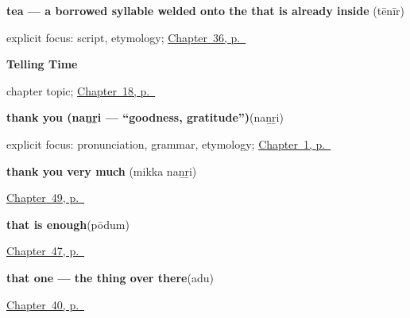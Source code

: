 \noindent\begin{minipage}[t]{\linewidth}
\raggedright
\textbf{tea — a borrowed syllable welded onto the  that is already inside }\enspace\emph{}\enspace(tēnīr)\par
\footnotesize explicit focus: script, etymology; \hyperref[ch:ta-what-you-are-offered]{Chapter~36, p.~\pageref*{ch:ta-what-you-are-offered}}
\end{minipage}\par\smallskip

\noindent\begin{minipage}[t]{\linewidth}
\raggedright
\textbf{Telling Time}\par
\footnotesize chapter topic; \hyperref[ch:ta-telling-time]{Chapter~18, p.~\pageref*{ch:ta-telling-time}}
\end{minipage}\par\smallskip

\noindent\begin{minipage}[t]{\linewidth}
\raggedright
\textbf{thank you (naṉṟi — \textquotedblleft{}goodness, gratitude\textquotedblright{})}\enspace\emph{}\enspace(naṉṟi)\par
\footnotesize explicit focus: pronunciation, grammar, etymology; \hyperref[ch:greetings]{Chapter~1, p.~\pageref*{ch:greetings}}
\end{minipage}\par\smallskip

\noindent\begin{minipage}[t]{\linewidth}
\raggedright
\textbf{thank you very much}\enspace\emph{ }\enspace(mikka naṉṟi)\par
\footnotesize \hyperref[ch:ta-courtesy]{Chapter~49, p.~\pageref*{ch:ta-courtesy}}
\end{minipage}\par\smallskip

\noindent\begin{minipage}[t]{\linewidth}
\raggedright
\textbf{that is enough}\enspace\emph{}\enspace(pōdum)\par
\footnotesize \hyperref[ch:ta-replies]{Chapter~47, p.~\pageref*{ch:ta-replies}}
\end{minipage}\par\smallskip

\noindent\begin{minipage}[t]{\linewidth}
\raggedright
\textbf{that one — the thing over there}\enspace\emph{}\enspace(adu)\par
\footnotesize \hyperref[ch:ta-pointing-and-asking]{Chapter~40, p.~\pageref*{ch:ta-pointing-and-asking}}
\end{minipage}\par\smallskip

